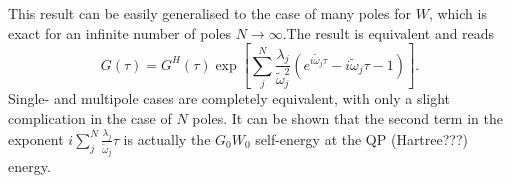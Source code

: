 \documentclass[a4paper,12pt]{article}
\def\be{\begin{equation}}
\def\ee{\end{equation}}
\begin{document}
This result can be easily generalised to the case of many poles for $W$, which is exact for
an infinite number of poles $N\rightarrow\infty$.The result is equivalent and reads
\be
 G(\tau) = G^H (\tau) \exp \left[ \sum_j^N \frac{\lambda_j}{\tilde\omega_j^2}  
   \left( e^{i\tilde\omega_j\tau} - i \tilde\omega_j \tau - 1 \right) \right] . 
\ee
Single- and multipole cases are completely equivalent, with only a slight complication in the 
case of $N$ poles. 
It can be shown that the second term in the exponent $i \sum_j^N \frac{\lambda_j}{\tilde\omega_j} \tau $
is actually the $G_0 W_0 $ self-energy at the QP (Hartree???) energy. 
\end{document}
